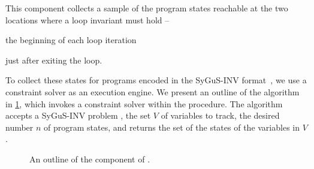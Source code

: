\documentclass[conference]{IEEEtran}
\begin{document}
\noindent
This component collects a sample of the program states reachable at the two locations where a loop invariant must hold --
\begin{andlist}
    \item the beginning of each loop iteration
    \item just after exiting the loop.
\end{andlist}
To collect these states for programs encoded in the SyGuS-INV format~\cite{Alur2016SyGuSComp2R},
we use a constraint solver as an execution engine.
We present an outline of the \Record algorithm in \cref{algo:record},
which invokes a constraint solver within the \GetModel procedure.
The algorithm accepts a SyGuS-INV problem \SyGuSINVQuadruplet,
the set $V$ of variables to track, the desired number $n$ of program states,
and returns the set \States of the states of the variables in $V$.




\begin{figure}[!t]
      \caption{An outline of the \Record component of \LoopInvGen.}
    \label{algo:record}
\end{figure}
\end{document}
